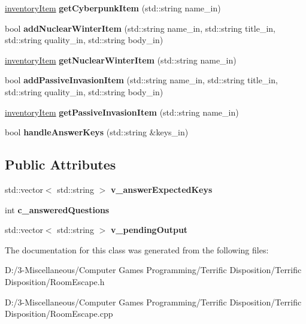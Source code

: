 \begin{DoxyCompactItemize}
\hyperlink{structinventory_item}{inventory\+Item} {\bfseries get\+Cyberpunk\+Item} (std\+::string name\+\_\+in)
\item 
\mbox{\label{class_room_escape_a1645efea79c2e3c2748e623f307d8c8f}} 
bool {\bfseries add\+Nuclear\+Winter\+Item} (std\+::string name\+\_\+in, std\+::string title\+\_\+in, std\+::string quality\+\_\+in, std\+::string body\+\_\+in)
\item 
\mbox{\label{class_room_escape_a16f7b623a47c8384361555cfbc5b2b37}} 
\hyperlink{structinventory_item}{inventory\+Item} {\bfseries get\+Nuclear\+Winter\+Item} (std\+::string name\+\_\+in)
\item 
\mbox{\label{class_room_escape_a8b9c1aa1d34a390e16b68d8883a7e158}} 
bool {\bfseries add\+Passive\+Invasion\+Item} (std\+::string name\+\_\+in, std\+::string title\+\_\+in, std\+::string quality\+\_\+in, std\+::string body\+\_\+in)
\item 
\mbox{\label{class_room_escape_ac8fc1c218e8b7a27f898328ac2d6eec7}} 
\hyperlink{structinventory_item}{inventory\+Item} {\bfseries get\+Passive\+Invasion\+Item} (std\+::string name\+\_\+in)
\item 
\mbox{\label{class_room_escape_ad8358331158170748a1cb399f4806dfb}} 
bool {\bfseries handle\+Answer\+Keys} (std\+::string \&keys\+\_\+in)
\end{DoxyCompactItemize}
\subsection*{Public Attributes}
\begin{DoxyCompactItemize}
\item 
\mbox{\label{class_room_escape_a79e81701e8a4ccf2b57f34d78cc1f555}} 
std\+::vector$<$ std\+::string $>$ {\bfseries v\+\_\+answer\+Expected\+Keys}
\item 
\mbox{\label{class_room_escape_a62a79b5f7a32bf63aa6112bdc5e6bfab}} 
int {\bfseries c\+\_\+answered\+Questions}
\item 
\mbox{\label{class_room_escape_a6763a828516fbf2738796f1c05751220}} 
std\+::vector$<$ std\+::string $>$ {\bfseries v\+\_\+pending\+Output}
\end{DoxyCompactItemize}


The documentation for this class was generated from the following files\+:\begin{DoxyCompactItemize}
\item 
D\+:/3-\/\+Miscellaneous/\+Computer Games Programming/\+Terrific Disposition/\+Terrific Disposition/Room\+Escape.\+h\item 
D\+:/3-\/\+Miscellaneous/\+Computer Games Programming/\+Terrific Disposition/\+Terrific Disposition/Room\+Escape.\+cpp\end{DoxyCompactItemize}
